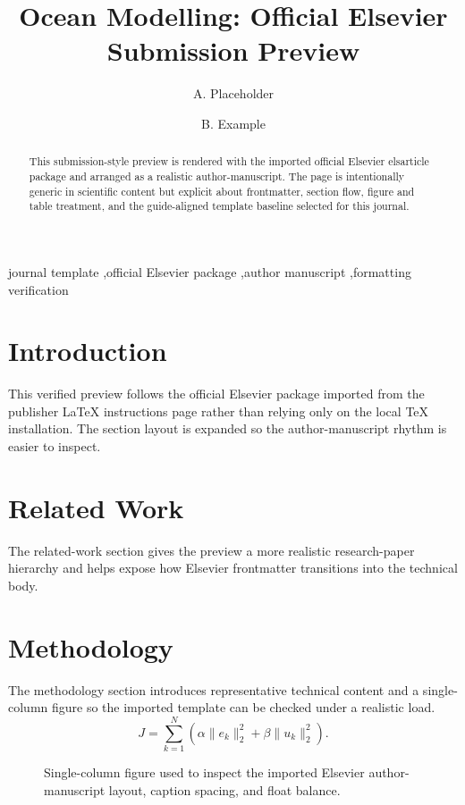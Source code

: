 \documentclass[preprint,12pt]{elsarticle}
\begin{document}
\begin{frontmatter}
\title{Ocean Modelling: Official Elsevier Submission Preview}
\author{A. Placeholder}
\author{B. Example}
\address{Department of Verified Templates, Placeholder Institute}
\begin{abstract}
This submission-style preview is rendered with the imported official Elsevier elsarticle package and arranged as a realistic author-manuscript. The page is intentionally generic in scientific content but explicit about frontmatter, section flow, figure and table treatment, and the guide-aligned template baseline selected for this journal.
\end{abstract}
\begin{keyword}
journal template \sep official Elsevier package \sep author manuscript \sep formatting verification
\end{keyword}
\end{frontmatter}
\section{Introduction}
This verified preview follows the official Elsevier package imported from the publisher LaTeX instructions page rather than relying only on the local TeX installation. The section layout is expanded so the author-manuscript rhythm is easier to inspect.
\section{Related Work}
The related-work section gives the preview a more realistic research-paper hierarchy and helps expose how Elsevier frontmatter transitions into the technical body.
\section{Methodology}
The methodology section introduces representative technical content and a single-column figure so the imported template can be checked under a realistic load.
\begin{equation}
J = \sum_{k=1}^{N} \left( \alpha \|e_k\|_2^2 + \beta \|u_k\|_2^2 \right).
\end{equation}
\begin{figure}[t]
\centering
{}
\caption{Single-column figure used to inspect the imported Elsevier author-manuscript layout, caption spacing, and float balance.}
\end{figure}
\end{document}
